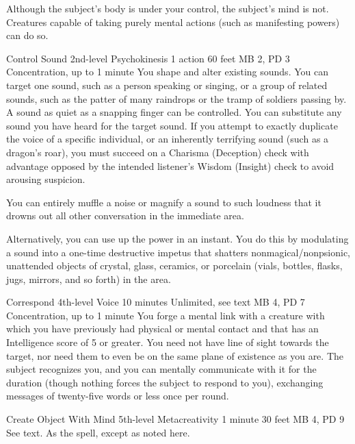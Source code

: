  Although the subject's body is under your control,
  the subject's mind is not.
  Creatures capable of taking purely mental actions
  (such as manifesting powers)
  can do so.

\DndPowerHeader%
  {Control Sound}
  {2nd-level Psychokinesis}
  {1 action}
  {60 feet}
  {MB 2, PD 3}
  {Concentration, up to 1 minute}
  You shape and alter existing sounds.
  You can target one sound, such as a person speaking or singing,
  or a group of related sounds,
  such as the patter of many raindrops or the tramp of soldiers passing by.
  A sound as quiet as a snapping finger can be controlled.
  You can substitute any sound you have heard for the target sound.
  If you attempt to exactly duplicate the voice of a specific individual,
  or an inherently terrifying sound (such as a dragon's roar),
  you must succeed on a Charisma (Deception) check with advantage
  opposed by the intended listener's Wisdom (Insight) check
  to avoid arousing suspicion.

  You can entirely muffle a noise or magnify a sound to such loudness
  that it drowns out all other conversation in the immediate area.
  
  Alternatively, you can use up the power in an instant.
  You do this by modulating a sound into a one-time destructive impetus
  that shatters nonmagical/nonpsionic,
  unattended objects of crystal, glass, ceramics, or porcelain
  (vials, bottles, flasks, jugs, mirrors, and so forth) in the area.

\DndPowerHeader%
  {Correspond}
  {4th-level Voice}
  {10 minutes}
  {Unlimited, see text}
  {MB 4, PD 7}
  {Concentration, up to 1 minute}
  You forge a mental link with a creature with which you have
  previously had physical or mental contact
  and that has an Intelligence score of 5 or greater.
  You need not have line of sight towards the target,
  nor need them to even be on the same
  plane of existence as you are.
  The subject recognizes you, and you can mentally communicate
  with it for the duration
  (though nothing forces the subject to respond to you),
  exchanging messages of twenty-five words or less once per round.

\DndPowerHeader%
  {Create Object With Mind}
  {5th-level Metacreativity}
  {1 minute}
  {30 feet}
  {MB 4, PD 9}
  {See text.}
As the  spell,
except as noted here.

